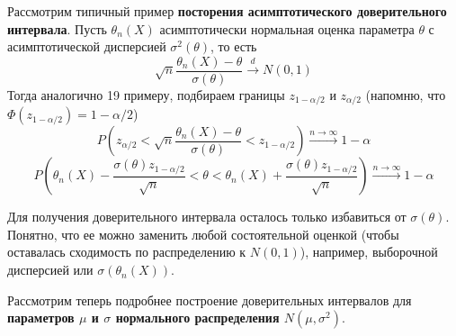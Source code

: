 \begin{example}
Рассмотрим типичный пример \textbf{посторения асимптотического доверительного интервала}. Пусть $\theta_n\left(X\right)$ асимптотически нормальная оценка параметра $\theta$ с асимптотической дисперсией $\sigma^ 2\left(\theta\right)$, то есть 
\[
    \sqrt{n} \frac{\theta_n\left(X\right) - \theta}{\sigma\left(\theta\right)} \xrightarrow{d} N\left(0, 1\right)
\]
Тогда аналогично 19 примеру, подбираем границы $z_{1-\alpha/2}$ и $z_{\alpha/2}$ (напомню, что $\Phi\left(z_{1-\alpha/2}\right) = 1 - \alpha/2$)
\[
    P\left(z_{\alpha/2} < \sqrt{n} \frac{\theta_n\left(X\right) - \theta}{\sigma\left(\theta\right)} < z_{1-\alpha/2}\right) \xrightarrow{n \to \infty} 1 - \alpha
\]\[
    P\left(\theta_n\left(X\right) - \frac{\sigma\left(\theta\right)z_{1-\alpha/2}}{\sqrt{n}} < \theta < \theta_n\left(X\right) + \frac{\sigma\left(\theta\right)z_{1-\alpha/2}}{\sqrt{n}}\right)\xrightarrow{n \to \infty} 1 - \alpha
\]

Для получения доверительного интервала осталось только избавиться от $\sigma{\left(\theta\right)}$. Понятно, что ее можно заменить любой состоятельной оценкой (чтобы оставалась сходимость по распределению к $N\left(0, 1\right)$), например, выборочной дисперсией или $\sigma\left(\theta_n\left(X\right)\right)$.
\end{example}

\par 
Рассмотрим теперь подробнее построение доверительных интервалов для \textbf{параметров $\mu$ и $\sigma$ нормального распределения $N\left(\mu, \sigma ^ 2\right)$}.


